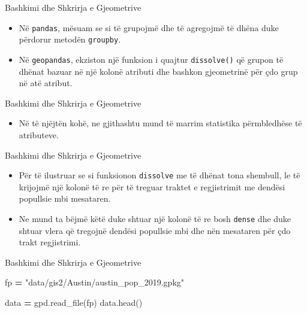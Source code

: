 \documentclass[
  ignorenonframetext,
]{beamer}
\newenvironment{Shaded}{\begin{snugshade}}{\end{snugshade}}
\newcommand{\NormalTok}[1]{#1}
\newcommand{\OperatorTok}[1]{\textcolor[rgb]{0.81,0.36,0.00}{\textbf{#1}}}
\newcommand{\StringTok}[1]{\textcolor[rgb]{0.31,0.60,0.02}{#1}}
\providecommand{\tightlist}{%
  \setlength{\itemsep}{0pt}\setlength{\parskip}{0pt}}
\begin{document}
\begin{frame}[fragile]{Bashkimi dhe Shkrirja e Gjeometrive}
\protect\hypertarget{bashkimi-dhe-shkrirja-e-gjeometrive-1}{}
\begin{itemize}
\item
  Në \texttt{pandas}, mësuam se si të grupojmë dhe të agregojmë të dhëna
  duke përdorur metodën \texttt{groupby}.
\item
  Në \texttt{geopandas}, ekziston një funksion i quajtur
  \texttt{dissolve()} që grupon të dhënat bazuar në një kolonë atributi
  dhe bashkon gjeometrinë për çdo grup në atë atribut.
\end{itemize}
\end{frame}

\begin{frame}{Bashkimi dhe Shkrirja e Gjeometrive}
\protect\hypertarget{bashkimi-dhe-shkrirja-e-gjeometrive-2}{}
\begin{itemize}
\tightlist
\item
  Në të njëjtën kohë, ne gjithashtu mund të marrim statistika
  përmbledhëse të atributeve.
\end{itemize}
\end{frame}

\begin{frame}[fragile]{Bashkimi dhe Shkrirja e Gjeometrive}
\protect\hypertarget{bashkimi-dhe-shkrirja-e-gjeometrive-3}{}
\begin{itemize}
\item
  Për të ilustruar se si funksionon \texttt{dissolve} me të dhënat tona
  shembull, le të krijojmë një kolonë të re për të treguar traktet e
  regjistrimit me dendësi popullsie mbi mesataren.
\item
  Ne mund ta bëjmë këtë duke shtuar një kolonë të re bosh \texttt{dense}
  dhe duke shtuar vlera që tregojnë dendësi popullsie mbi dhe nën
  mesataren për çdo trakt regjistrimi.
\end{itemize}
\end{frame}

\begin{frame}[fragile]{Bashkimi dhe Shkrirja e Gjeometrive}
\protect\hypertarget{bashkimi-dhe-shkrirja-e-gjeometrive-4}{}
\begin{Shaded}
\begin{Highlighting}[]
\NormalTok{fp }\OperatorTok{=} \StringTok{"data/gis2/Austin/austin\_pop\_2019.gpkg"}

\NormalTok{data }\OperatorTok{=}\NormalTok{ gpd.read\_file(fp)}
\NormalTok{data.head()}
\end{Highlighting}
\end{Shaded}
\end{frame}
\end{document}
